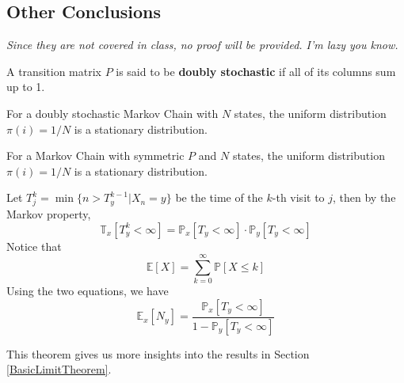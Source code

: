 \subsection{Other Conclusions}
\emph{Since they are not covered in class, no proof will be provided. I'm lazy you know.}
\begin{definition}
    A transition matrix $P$ is said to be \textbf{doubly stochastic} if all of its columns sum up to 1.
\end{definition}
\begin{optTheorem}
    For a doubly stochastic Markov Chain with $N$ states, the uniform distribution $\pi(i) = 1/N$ is a stationary distribution.
\end{optTheorem}
\begin{optTheorem}
    For a Markov Chain with symmetric $P$ and $N$ states, the uniform distribution $\pi(i) = 1/N$ is a stationary distribution.
\end{optTheorem}
\begin{optTheorem}
    Let $T_j^k = \min\{ n > T_y^{k-1} | X_n = y \}$ be the time of the $k$-th visit to $j$, then by the Markov property,
    \[ \mathbb{T}_x[T_y^k < \infty] = \mathbb{P}_x[T_y < \infty]\cdot\mathbb{P}_y[T_y<\infty] \]
    Notice that
    \[ \mathbb{E}[X] = \sum_{k=0}^{\infty}\mathbb{P}[X \le k] \]
    Using the two equations, we have
    \[ \mathbb{E}_x[N_y] = \frac{\mathbb{P}_x[T_y < \infty]}{1-\mathbb{P}_y[T_y < \infty]} \]
\end{optTheorem}
\begin{remark}
    This theorem gives us more insights into the results in Section \ref{BasicLimitTheorem}.
\end{remark}